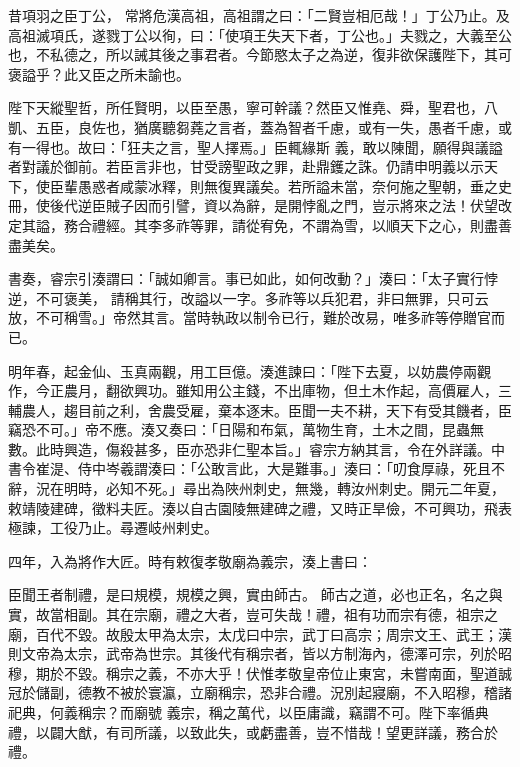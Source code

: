 \begin{pinyinscope}
 昔項羽之臣丁公，
 常將危漢高祖，高祖謂之曰：「二賢豈相厄哉！」丁公乃止。及高祖滅項氏，遂戮丁公以徇，曰：「使項王失天下者，丁公也。」夫戮之，大義至公也，不私德之，所以誡其後之事君者。今節愍太子之為逆，復非欲保護陛下，其可褒謚乎？此又臣之所未諭也。



 陛下天縱聖哲，所任賢明，以臣至愚，寧可幹議？然臣又惟堯、舜，聖君也，八凱、五臣，良佐也，猶廣聽芻蕘之言者，蓋為智者千慮，或有一失，愚者千慮，或有一得也。故曰：「狂夫之言，聖人擇焉。」臣輒緣斯
 義，敢以陳聞，願得與議謚者對議於御前。若臣言非也，甘受謗聖政之罪，赴鼎鑊之誅。仍請申明義以示天下，使臣輩愚惑者咸蒙冰釋，則無復異議矣。若所謚未當，奈何施之聖朝，垂之史冊，使後代逆臣賊子因而引譬，資以為辭，是開悖亂之門，豈示將來之法！伏望改定其謚，務合禮經。其李多祚等罪，請從宥免，不謂為雪，以順天下之心，則盡善盡美矣。



 書奏，睿宗引湊謂曰：「誠如卿言。事已如此，如何改動？」湊曰：「太子實行悖逆，不可褒美，
 請稱其行，改謚以一字。多祚等以兵犯君，非曰無罪，只可云放，不可稱雪。」帝然其言。當時執政以制令已行，難於改易，唯多祚等停贈官而已。



 明年春，起金仙、玉真兩觀，用工巨億。湊進諫曰：「陛下去夏，以妨農停兩觀作，今正農月，翻欲興功。雖知用公主錢，不出庫物，但土木作起，高價雇人，三輔農人，趨目前之利，舍農受雇，棄本逐末。臣聞一夫不耕，天下有受其饑者，臣竊恐不可。」帝不應。湊又奏曰：「日陽和布氣，萬物生育，土木之間，昆蟲無
 數。此時興造，傷殺甚多，臣亦恐非仁聖本旨。」睿宗方納其言，令在外詳議。中書令崔湜、侍中岑羲謂湊曰：「公敢言此，大是難事。」湊曰：「叨食厚祿，死且不辭，況在明時，必知不死。」尋出為陜州刺史，無幾，轉汝州刺史。開元二年夏，敕靖陵建碑，徵料夫匠。湊以自古園陵無建碑之禮，又時正旱儉，不可興功，飛表極諫，工役乃止。尋遷岐州剌史。



 四年，入為將作大匠。時有敕復孝敬廟為義宗，湊上書曰：



 臣聞王者制禮，是曰規模，規模之興，實由師古。
 師古之道，必也正名，名之與實，故當相副。其在宗廟，禮之大者，豈可失哉！禮，祖有功而宗有德，祖宗之廟，百代不毀。故殷太甲為太宗，太戊曰中宗，武丁曰高宗；周宗文王、武王；漢則文帝為太宗，武帝為世宗。其後代有稱宗者，皆以方制海內，德澤可宗，列於昭穆，期於不毀。稱宗之義，不亦大乎！伏惟孝敬皇帝位止東宮，未嘗南面，聖道誠冠於儲副，德教不被於寰瀛，立廟稱宗，恐非合禮。況別起寢廟，不入昭穆，稽諸祀典，何義稱宗？而廟號
 義宗，稱之萬代，以臣庸識，竊謂不可。陛下率循典禮，以闢大猷，有司所議，以致此失，或虧盡善，豈不惜哉！望更詳議，務合於禮。




\end{pinyinscope}
